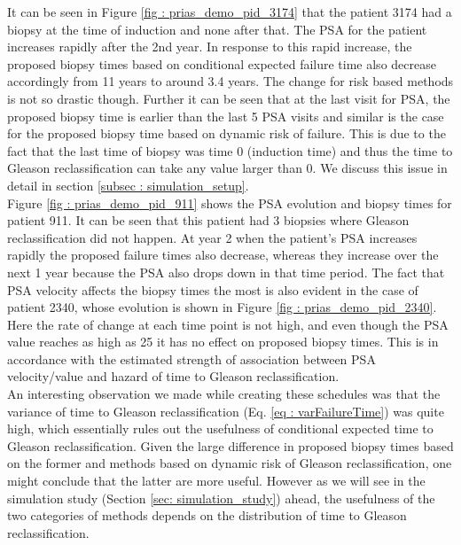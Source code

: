 It can be seen in Figure \ref{fig : prias_demo_pid_3174} that the patient 3174 had a biopsy at the time of induction and none after that. The PSA for the patient increases rapidly after the 2nd year. In response to this rapid increase, the proposed biopsy times based on conditional expected failure time also decrease accordingly from 11 years to around 3.4 years. The change for risk based methods is not so drastic though. Further it can be seen that at the last visit for PSA, the proposed biopsy time is earlier than the last 5 PSA visits and similar is the case for the proposed biopsy time based on dynamic risk of failure. This is due to the fact that the last time of biopsy was time 0 (induction time) and thus the time to Gleason reclassification can take any value larger than 0. We discuss this issue in detail in section \ref{subsec : simulation_setup}.\\

Figure \ref{fig : prias_demo_pid_911} shows the PSA evolution and biopsy times for patient 911. It can be seen that this patient had 3 biopsies where Gleason reclassification did not happen. At year 2 when the patient's PSA increases rapidly the proposed failure times also decrease, whereas they increase over the next 1 year because the PSA also drops down in that time period. The fact that PSA velocity affects the biopsy times the most is also evident in the case of patient 2340, whose evolution is shown in Figure \ref{fig : prias_demo_pid_2340}. Here the rate of change at each time point is not high, and even though the PSA value reaches as high as 25 it has no effect on proposed biopsy times. This is in accordance with the estimated strength of association between PSA velocity/value and hazard of time to Gleason reclassification.\\

An interesting observation we made while creating these schedules was that the variance of time to Gleason reclassification (Eq. \ref{eq : varFailureTime}) was quite high, which essentially rules out the usefulness of conditional expected time to Gleason reclassification. Given the large difference in proposed biopsy times based on the former and methods based on dynamic risk of Gleason reclassification, one might conclude that the latter are more useful. However as we will see in the simulation study (Section \ref{sec: simulation_study}) ahead, the usefulness of the two categories of methods depends on the distribution of time to Gleason reclassification.
